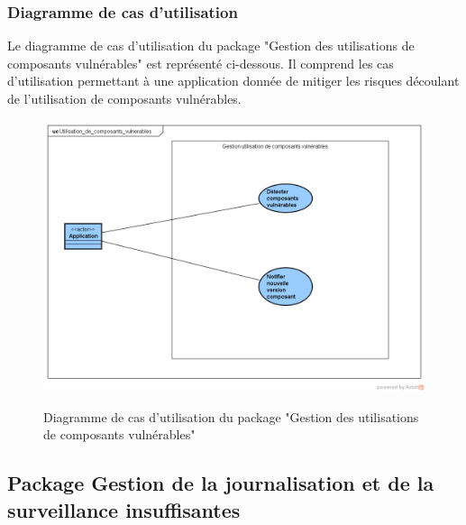 \subsubsection{Diagramme de cas d'utilisation}
Le diagramme de cas d'utilisation du package "Gestion des utilisations de composants vulnérables" est représenté ci-dessous. Il comprend les cas d'utilisation permettant à une application donnée de mitiger les risques découlant de l'utilisation de composants vulnérables.\\ 
\begin{figure}[H]
	\centering
	\begin{minipage}{12cm}
		\centering
		{\includegraphics[height=0.30\textheight]{fig/Utilisation-composants-vulnerables-use-case-diagram.png}}
	\end{minipage}
	\caption{Diagramme de cas d'utilisation du package "Gestion des utilisations de composants vulnérables"}
	\label{fig:7.10}
\end{figure}

\subsection{Package Gestion de la journalisation et de la surveillance insuffisantes}
